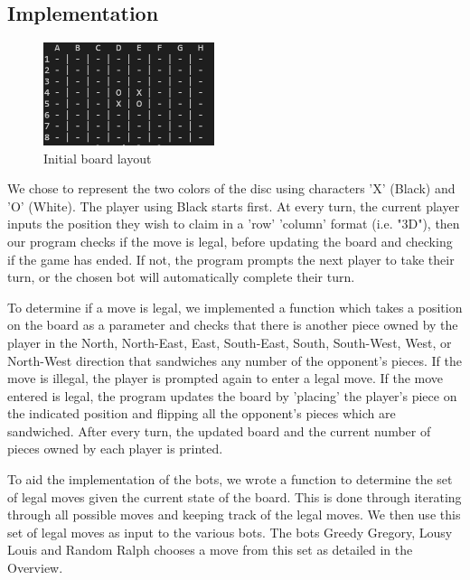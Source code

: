 \documentclass[a4paper,11pt]{article}
\begin{document}
\subsection{Implementation}

\begin{figure}[hpt]
    \centering
    \includegraphics[width=5cm]{othello_initial_board.png}
    \caption{Initial board layout}
    \label{fig:initial othello board}
\end{figure}

We chose to represent the two colors of the disc using characters 'X' (Black) and 'O' (White). The player using Black starts first. At every turn, the current player inputs the position they wish to claim in a 'row' 'column' format (i.e. "3D"), then our program checks if the move is legal, before updating the board and checking if the game has ended. If not, the program prompts the next player to take their turn, or the chosen bot will automatically complete their turn. \newline

To determine if a move is legal, we implemented a function which takes a position on the board as a parameter and checks that there is another piece owned by the player in the North, North-East, East, South-East, South, South-West, West, or North-West direction that sandwiches any number of the opponent's pieces. If the move is illegal, the player is prompted again to enter a legal move. If the move entered is legal, the program updates the board by 'placing' the player's piece on the indicated position and flipping all the opponent's pieces which are sandwiched. After every turn, the updated board and the current number of pieces owned by each player is printed. \newline

To aid the implementation of the bots, we wrote a function to determine the set of legal moves given the current state of the board. This is done through iterating through all possible moves and keeping track of the legal moves. We then use this set of legal moves as input to the various bots. The bots Greedy Gregory, Lousy Louis and Random Ralph chooses a move from this set as detailed in the Overview. \newline
\end{document}
